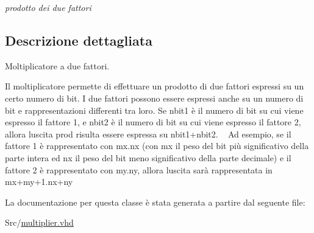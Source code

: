 \begin{DoxyCompactItemize}
\begin{DoxyCompactList}\small\item\em prodotto dei due fattori \end{DoxyCompactList}\end{DoxyCompactItemize}


\subsection{Descrizione dettagliata}
Moltiplicatore a due fattori.

Il moltiplicatore permette di effettuare un prodotto di due fattori espressi su un certo numero di bit. I due fattori possono essere espressi anche su un numero di bit e rappresentazioni differenti tra loro. Se nbit1 è il numero di bit su cui viene espresso il fattore 1, e nbit2 è il numero di bit su cui viene espresso il fattore 2, allora l\textquotesingle{}uscita prod risulta essere espressa su nbit1+nbit2. ~\newline
 Ad esempio, se il fattore 1 è rappresentato con mx.\+nx (con mx il peso del bit più significativo della parte intera ed nx il peso del bit meno significativo della parte decimale) e il fattore 2 è rappresentato con my.\+ny, allora l\textquotesingle{}uscita sarà rappresentata in mx+my+1.nx+ny 

La documentazione per questa classe è stata generata a partire dal seguente file\+:\begin{DoxyCompactItemize}
\item 
Src/\hyperlink{multiplier_8vhd}{multiplier.\+vhd}\end{DoxyCompactItemize}
